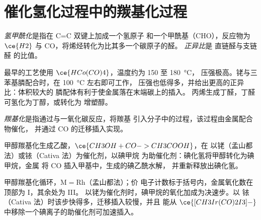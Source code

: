 \section{催化氢化过程中的羰基化过程}

\begin{definition}[氢甲酰化]\label{def:b3:homogeneous-catalysis:hydroformylation}
\emph{氢甲酰化}是指在 C=C 双键上加成一个氢原子
和一个甲酰基（CHO），反应物为 $\ce{H2}$ 与 CO，将烯烃转化为比其多一个碳原子的醛。
\emph{正异比}是
直链醛与支链醛
的比值。
\end{definition}

最早的工艺使用 $\ce{HCo(CO)4}$，温度约为 150 至 \qty{180}{\celsius}，
压强极高。铑与三苯基膦配合时，在 \qty{100}{\celsius} 左右即可工作，
压强也低得多，并给出更高的正异比：体积较大的
膦配体有利于使金属落在末端碳上的插入。
丙烯生成丁醛，丁醛可氢化为丁醇，或转化为
增塑醇。

\begin{definition}[羰基化]\label{def:b3:homogeneous-catalysis:carbonylation}
\emph{羰基化}是指通过与一氧化碳反应，将羰基
引入分子中的过程，该过程由金属配合物催化，
并通过 CO 的迁移插入实现。
\end{definition}

甲醇羰基化生成乙酸，$\ce{CH3OH + CO -> CH3COOH}$，在
以铑（孟山都法）或铱（Cativa 法）为催化剂，以碘甲烷
为助催化剂：碘化氢将甲醇转化为碘甲烷，金属
将 CO 插入甲基中，生成的碘乙酰水解，
并重新释放出碘化氢。

\begin{omfigure}

{\small 甲醇羰基化循环，$\mathrm M = \mathrm{Rh}$（孟山都法）；价
电子计数标于括号内，金属氧化数在顶部为 I，其余处为 III。
以铑为催化剂时，碘甲烷的氧化加成为决速步。以
铱（Cativa 法）时该步快得多，迁移插入较慢，并且
能从 $\ce{[CH3Ir(CO)2I3]-}$ 中移除一个碘离子的助催化剂可加速插入。}
\end{omfigure}

